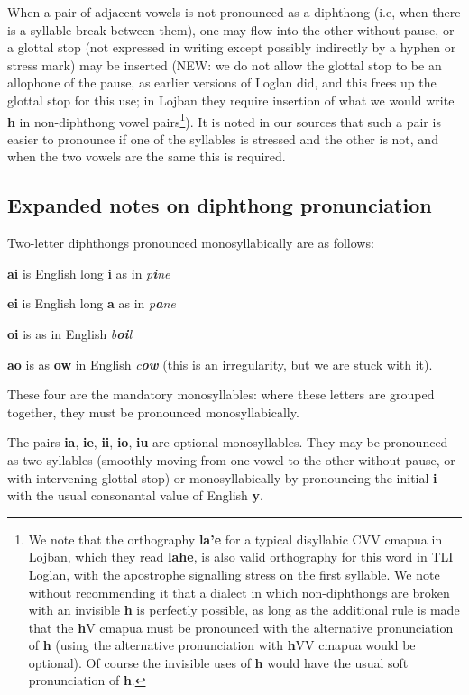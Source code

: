\documentclass[12pt]{book}
\begin{document}
When a pair of adjacent vowels is not pronounced as a diphthong (i.e, when there is a syllable break between them), one may flow into the other without pause, or a glottal stop (not expressed in writing except possibly indirectly by a hyphen or stress mark)  may be inserted (NEW:  we do not allow the glottal stop to be an allophone of the pause, as earlier versions of Loglan did, and this frees up the glottal stop for this use; in Lojban they require insertion of what we would write {\bf h} in non-diphthong vowel pairs\footnote{We note that the orthography {\bf la'e} for a typical disyllabic CVV cmapua in Lojban, which they read {\bf lahe}, is also valid orthography for this word in TLI Loglan, with the apostrophe signalling stress on the first syllable.  We note without recommending it that a dialect in which non-diphthongs are broken with an invisible {\bf h} is perfectly possible, as long as the additional rule is made that the {\bf h}V cmapua must be pronounced with the alternative pronunciation of {\bf h} (using the alternative pronunciation with {\bf h}VV cmapua would be optional).  Of course the invisible uses of {\bf h} would have the usual soft pronunciation of {\bf h}.}).  It is noted in our sources that such a pair is easier to pronounce if one of the syllables is stressed and the other is not, and when the two vowels are the same this is required.  

\subsection{Expanded notes on diphthong pronunciation}

Two-letter diphthongs pronounced monosyllabically are as follows:

{\bf ai} is English long {\bf i} as in {\em p{\bf i}ne\/}

{\bf ei} is English long {\bf a} as in {\em p{\bf a}ne\/}

{\bf oi} is as in English {\em b{\bf oi}l\/}

{\bf ao} is as {\bf ow} in English {\em c{\bf ow}\/}  (this is an irregularity, but we are stuck with it).

These four are the mandatory monosyllables:  where these letters are grouped together, they must be pronounced monosyllabically.

The pairs {\bf ia}, {\bf ie}, {\bf ii}, {\bf io}, {\bf iu} are optional monosyllables.  They may be pronounced as two syllables (smoothly moving from one vowel to the other without pause, or with intervening glottal stop)
or monosyllabically by pronouncing the initial {\bf i} with the usual consonantal value of English {\bf y}.
\end{document}
